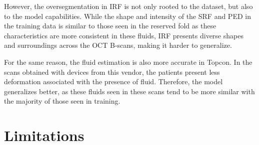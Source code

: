 \par
However, the oversegmentation in IRF is not only rooted to the dataset, but also to the model capabilities. While the shape and intensity of the SRF and PED in the training data is similar to those seen in the reserved fold as these characteristics are more consistent in these fluids, IRF presents diverse shapes and surroundings across the OCT B-scans, making it harder to generalize.
\par
For the same reason, the fluid estimation is also more accurate in Topcon. In the scans obtained with devices from this vendor, the patients present less deformation associated with the presence of fluid. Therefore, the model generalizes better, as these fluids seen in these scans tend to be more similar with the majority of those seen in training.

\section{Limitations}

